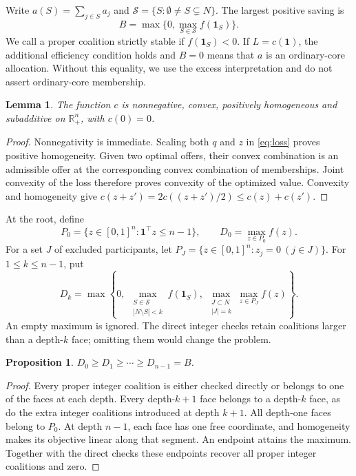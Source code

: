\documentclass[11pt,a4paper]{article}
\newtheorem{proposition}[theorem]{Proposition}
\newtheorem{lemma}[theorem]{Lemma}
\theoremstyle{remark}
\newcommand{\R}{\mathbb R}
\newcommand{\one}{\mathbf 1}
\newcommand{\subsets}{\mathcal S}
\begin{document}
Write $a(S)=\sum_{j\in S}a_j$ and
$\subsets=\{S:\emptyset\ne S\subsetneq N\}$. The largest positive saving is
\begin{equation}\label{eq:B}
 B=\max\{0,\max_{S\in\subsets}f(\one_S)\}.
\end{equation}
We call a proper coalition strictly stable if $f(\one_S)<0$.
If $L=c(\one)$, the additional efficiency condition holds and $B=0$
means that $a$ is an ordinary-core allocation. Without this equality,
we use the excess interpretation and do not assert ordinary-core membership.

\begin{lemma}\label{lem:sublinear}
The function $c$ is nonnegative, convex, positively homogeneous and
subadditive on $\R_+^n$, with $c(0)=0$.
\end{lemma}
\begin{proof}
Nonnegativity is immediate. Scaling both $q$ and $z$ in
\eqref{eq:loss} proves positive homogeneity. Given two optimal offers,
their convex combination is an admissible offer at the corresponding
convex combination of memberships. Joint convexity of the loss therefore
proves convexity of the optimized value. Convexity and homogeneity give
$c(z+z')=2c((z+z')/2)\le c(z)+c(z')$.
\end{proof}

At the root, define
\[
 P_0=\{z\in[0,1]^n:\one^\top z\le n-1\},\qquad
 D_0=\max_{z\in P_0}f(z).
\]
For a set $J$ of excluded participants, let
$P_J=\{z\in[0,1]^n:z_j=0\ (j\in J)\}$. For $1\le k\le n-1$, put
\begin{equation}\label{eq:Dk}
 D_k=\max\left\{0,\
    \max_{\substack{S\in\subsets\\|N\setminus S|<k}}f(\one_S),\
    \max_{\substack{J\subset N\\|J|=k}}\max_{z\in P_J}f(z)\right\}.
\end{equation}
An empty maximum is ignored. The direct integer checks retain coalitions
larger than a depth-$k$ face; omitting them would change the problem.

\begin{proposition}\label{prop:hierarchy}
$D_0\ge D_1\ge\cdots\ge D_{n-1}=B$.
\end{proposition}
\begin{proof}
Every proper integer coalition is either checked directly or belongs to
one of the faces at each depth. Every depth-$k+1$ face belongs to a
depth-$k$ face, as do the extra integer coalitions introduced at depth
$k+1$. All depth-one faces belong to $P_0$. At depth $n-1$, each face
has one free coordinate, and homogeneity makes its objective linear along
that segment. An endpoint attains the maximum. Together with the direct
checks these endpoints recover all proper integer coalitions and zero.
\end{proof}
\end{document}
